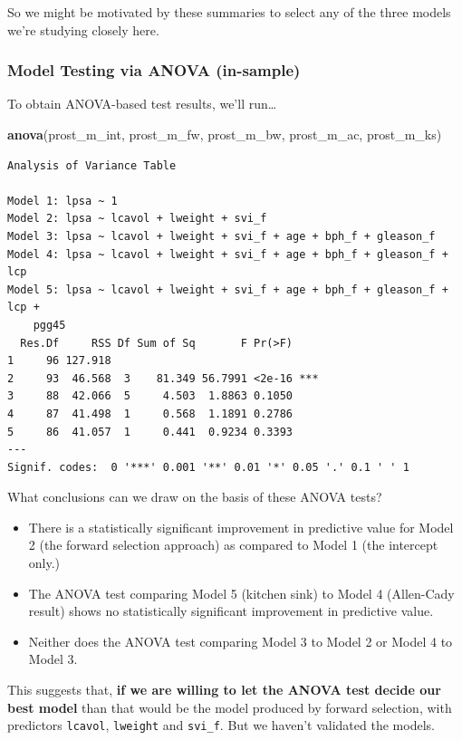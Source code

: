 \documentclass[]{book}
\newenvironment{Shaded}{\begin{snugshade}}{\end{snugshade}}
\newcommand{\KeywordTok}[1]{\textcolor[rgb]{0.13,0.29,0.53}{\textbf{#1}}}
\newcommand{\NormalTok}[1]{#1}
\providecommand{\tightlist}{%
  \setlength{\itemsep}{0pt}\setlength{\parskip}{0pt}}
\theoremstyle{definition}
\theoremstyle{definition}
\theoremstyle{definition}
\theoremstyle{remark}
\begin{document}
So we might be motivated by these summaries to select any of the three
models we're studying closely here.

\subsubsection{Model Testing via ANOVA
(in-sample)}\label{model-testing-via-anova-in-sample}

To obtain ANOVA-based test results, we'll run\ldots{}

\begin{Shaded}
\begin{Highlighting}[]
\KeywordTok{anova}\NormalTok{(prost_m_int, prost_m_fw, prost_m_bw, prost_m_ac, prost_m_ks)}
\end{Highlighting}
\end{Shaded}

\begin{verbatim}
Analysis of Variance Table

Model 1: lpsa ~ 1
Model 2: lpsa ~ lcavol + lweight + svi_f
Model 3: lpsa ~ lcavol + lweight + svi_f + age + bph_f + gleason_f
Model 4: lpsa ~ lcavol + lweight + svi_f + age + bph_f + gleason_f + lcp
Model 5: lpsa ~ lcavol + lweight + svi_f + age + bph_f + gleason_f + lcp + 
    pgg45
  Res.Df     RSS Df Sum of Sq       F Pr(>F)    
1     96 127.918                                
2     93  46.568  3    81.349 56.7991 <2e-16 ***
3     88  42.066  5     4.503  1.8863 0.1050    
4     87  41.498  1     0.568  1.1891 0.2786    
5     86  41.057  1     0.441  0.9234 0.3393    
---
Signif. codes:  0 '***' 0.001 '**' 0.01 '*' 0.05 '.' 0.1 ' ' 1
\end{verbatim}

What conclusions can we draw on the basis of these ANOVA tests?

\begin{itemize}
\tightlist
\item
  There is a statistically significant improvement in predictive value
  for Model 2 (the forward selection approach) as compared to Model 1
  (the intercept only.)
\item
  The ANOVA test comparing Model 5 (kitchen sink) to Model 4 (Allen-Cady
  result) shows no statistically significant improvement in predictive
  value.
\item
  Neither does the ANOVA test comparing Model 3 to Model 2 or Model 4 to
  Model 3.
\end{itemize}

This suggests that, \textbf{if we are willing to let the ANOVA test
decide our best model} than that would be the model produced by forward
selection, with predictors \texttt{lcavol}, \texttt{lweight} and
\texttt{svi\_f}. But we haven't validated the models.
\end{document}
